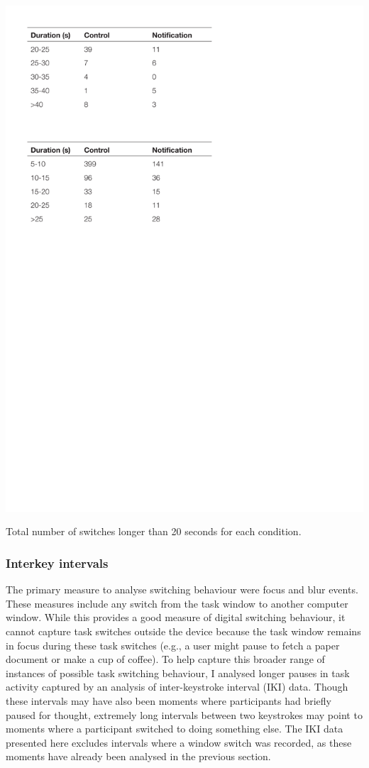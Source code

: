 \begin{table}
\centering
\centerline{\includegraphics[scale=0.8]{images/ch56/ch56_LongSwitches.pdf}}
\caption[Study 6 frequency of long switches]{Total number of switches longer than 20 seconds for each condition.}
\label{tbl:ch56-tblswitches}
\end{table}

\subsubsection{Interkey intervals}
The primary measure to analyse switching behaviour were focus and blur events. These measures include any switch from the task window to another computer window. While this provides a good measure of digital switching behaviour, it cannot capture task switches outside the device because the task window remains in focus during these task switches (e.g., a user might pause to fetch a paper document or make a cup of coffee). To help capture this broader range of instances of possible task switching behaviour, I analysed longer pauses in task activity captured by an analysis of inter-keystroke interval (IKI) data. Though these intervals may have also been moments where participants had briefly paused for thought, extremely long intervals between two keystrokes may point to moments where a participant switched to doing something else. The IKI data presented here excludes intervals where a window switch was recorded, as these moments have already been analysed in the previous section.

